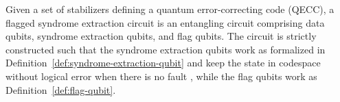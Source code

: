 \documentclass[acmsmallw,review]{acmart}
\begin{document}
\begin{definition}
\label{def:flagged-syndrome-circuit}
    Given a set of stabilizers defining a quantum error-correcting code (QECC), a flagged syndrome extraction circuit is an entangling circuit comprising data qubits, syndrome extraction qubits, and flag qubits. The circuit is strictly constructed such that the syndrome extraction qubits work as formalized in Definition~\ref{def:syndrome-extraction-qubit} and keep the state in codespace  without logical error when there is no fault , while the flag qubits work as Definition~\ref{def:flag-qubit}.
\end{definition}

\begin{figure}[htbp]
    \centering
    \hspace*{-1cm}
\end{figure}
\end{document}
